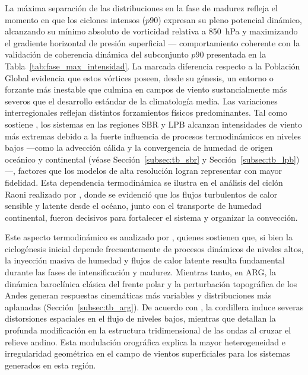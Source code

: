 La máxima separación de las distribuciones en la fase de madurez refleja el momento en que los ciclones intensos ($p90$) expresan su pleno potencial dinámico, alcanzando su mínimo absoluto de vorticidad relativa a 850~hPa y maximizando el gradiente horizontal de presión superficial --- comportamiento coherente con la validación de coherencia dinámica del subconjunto $p90$ presentada en la Tabla~\ref{tab:fase_max_intensidad}. La marcada diferencia respecto a la Población Global evidencia que estos vórtices poseen, desde su génesis, un entorno o forzante más inestable que culmina en campos de viento sustancialmente más severos que el desarrollo estándar de la climatología media.
Las variaciones interregionales reflejan distintos forzamientos físicos predominantes. Tal como sostiene \citet{gramcianinov2024early}, los sistemas en las regiones SBR y LPB alcanzan intensidades de viento más extremas debido a la fuerte influencia de procesos termodinámicos en niveles bajos ---como la advección cálida y la convergencia de humedad de origen oceánico y continental (véase Sección~\ref{subsec:tb_sbr} y Sección~\ref{subsec:tb_lpb})---, factores que los modelos de alta resolución logran representar con mayor fidelidad. 
Esta dependencia termodinámica se ilustra en el análisis del ciclón Raoni realizado por \citet{reboita2022from}, donde se evidenció que los flujos turbulentos de calor sensible y latente desde el océano, junto con el transporte de humedad continental, fueron decisivos para fortalecer el sistema y organizar la convección.

Este aspecto termodinámico es analizado por \citet{russo2025impacts}, quienes sostienen que, si bien la ciclogénesis inicial depende frecuentemente de procesos dinámicos de niveles altos, la inyección masiva de humedad y flujos de calor latente resulta fundamental durante las fases de intensificación y madurez.
Mientras tanto, en ARG, la dinámica baroclínica clásica del frente polar y la perturbación topográfica de los Andes generan respuestas cinemáticas más variables y distribuciones más aplanadas (Sección~\ref{subsec:tb_arg}). 
De acuerdo con \citet{gan1994influence}, la cordillera induce severas distorsiones espaciales en el flujo de niveles bajos, mientras que \citet{vera2002cold} detallan la profunda modificación en la estructura tridimensional de las ondas al cruzar el relieve andino. 
Esta modulación orográfica explica la mayor heterogeneidad e irregularidad geométrica en el campo de vientos superficiales para los sistemas generados en esta región.

